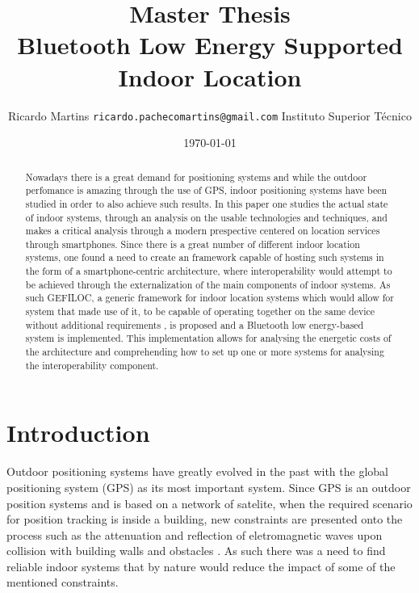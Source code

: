 \documentclass[a4paper]{IEEEtran}
\title{{ \normalsize Master Thesis} \\
	Bluetooth Low Energy Supported Indoor Location}
\author{
	Ricardo Martins {\tt ricardo.pachecomartins@gmail.com}
	Instituto Superior T\'{e}cnico}
\date{\today}
\begin{document}
\maketitle

\begin{abstract}

Nowadays there is a great demand for positioning systems and while the outdoor perfomance is amazing through the use of GPS, indoor positioning systems have been studied in order to also achieve such results. In this paper one studies the actual state of indoor systems, through an analysis on the usable technologies and techniques, and makes a critical analysis through a modern prespective centered on location services through smartphones. Since there is a great number of different indoor location systems, one found a need to create an framework capable of hosting such systems in the form of a smartphone-centric architecture, where interoperability would attempt to be achieved through the externalization of the main components of indoor systems. As such GEFILOC, a generic framework for indoor location systems which would allow for system that made use of it, to be capable of operating together on the same device without additional requirements , is proposed and a Bluetooth low energy-based system is implemented. This implementation allows for analysing the energetic costs of the architecture and comprehending how to set up one or more systems for analysing the interoperability component. 

\end{abstract}

\section{Introduction}
\label{sec:Introduction}

Outdoor positioning systems have greatly evolved in the past with the global positioning system (GPS) as its most important system. Since GPS is an outdoor position systems and is based on a network of satelite, when the required scenario for position tracking is inside a building, new constraints are presented onto the process such as the attenuation and reflection of eletromagnetic waves upon collision with building walls and obstacles \cite{survey1}. As such there was a need to find reliable indoor systems that by nature would reduce the impact of some of the mentioned constraints.
\end{document}

